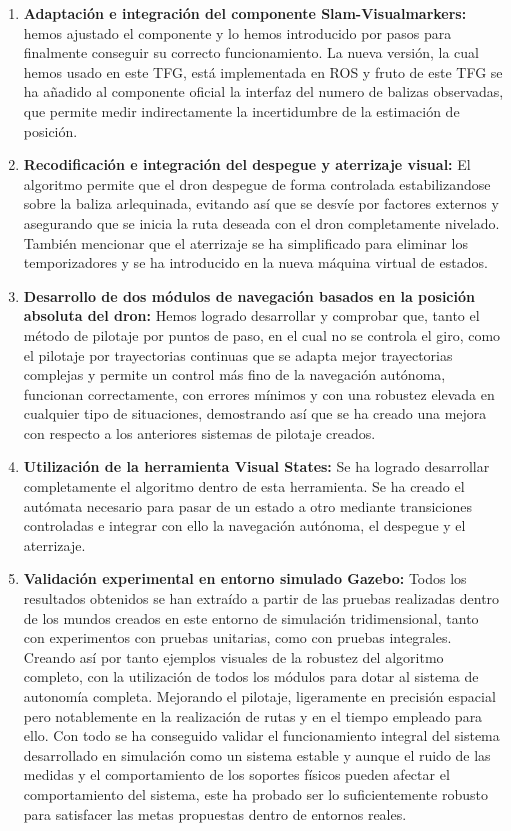 \begin{enumerate}
	\item{\textbf{Adaptación e integración del componente Slam-Visualmarkers:} hemos ajustado el componente y lo hemos introducido por pasos para finalmente conseguir su correcto funcionamiento. La nueva versión,  la cual hemos usado en este TFG, está implementada en ROS y fruto de este TFG se ha añadido al componente oficial la interfaz del numero de balizas observadas, que permite medir indirectamente la incertidumbre de la estimación de posición.}	
	\item{\textbf{Recodificación e integración del despegue y aterrizaje visual:} El algoritmo permite que el dron despegue de forma controlada estabilizandose sobre la baliza arlequinada, evitando así que se desvíe por factores externos y asegurando que se inicia la ruta deseada con el dron completamente nivelado. También mencionar que el aterrizaje se ha simplificado para eliminar los temporizadores y se ha introducido en la nueva máquina virtual de estados.}
	\item{\textbf{Desarrollo de dos módulos de navegación basados en la posición absoluta del dron:} Hemos logrado desarrollar y comprobar que, tanto el método de pilotaje por puntos de paso, en el cual no se controla el giro, como el pilotaje por trayectorias continuas que se
adapta mejor trayectorias complejas y permite un control más fino de la navegación autónoma, funcionan correctamente, con errores mínimos y con una robustez elevada en cualquier tipo de situaciones, demostrando así que se ha creado una mejora con respecto a los anteriores sistemas de pilotaje creados.}
	\item{\textbf{Utilización de la herramienta Visual States:} Se ha logrado desarrollar completamente el algoritmo dentro de esta herramienta. Se ha creado el autómata necesario para pasar de un estado a otro mediante transiciones controladas e integrar con ello la navegación autónoma, el despegue y el aterrizaje.}	
	\item{\textbf{Validación experimental en entorno simulado Gazebo:} Todos los resultados obtenidos se han extraído a partir de las pruebas realizadas dentro de los mundos creados en este entorno de simulación tridimensional, tanto con experimentos con pruebas unitarias, como con pruebas integrales. Creando así por tanto ejemplos visuales de la robustez del algoritmo completo, con la utilización de todos los módulos para dotar al sistema de autonomía completa. Mejorando el pilotaje, ligeramente en precisión espacial pero notablemente en la realización de rutas y en el tiempo empleado para ello. Con todo se ha conseguido validar el funcionamiento integral del sistema desarrollado en simulación como un sistema estable y aunque el ruido de las medidas y el comportamiento de los soportes físicos pueden afectar el comportamiento del sistema, este ha probado ser lo suficientemente robusto para satisfacer las metas propuestas dentro de entornos reales.}
\end{enumerate}

